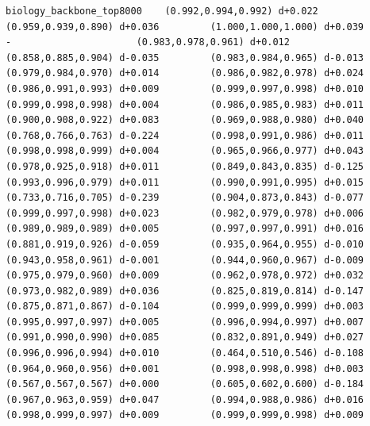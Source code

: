 \documentclass[11pt, letterpaper, openany]{book}
\begin{document}
\begin{empiricalbox}
\begin{lstlisting}[style=terminal]
biology_backbone_top8000    (0.992,0.994,0.992) d+0.022         (0.959,0.939,0.890) d+0.036         (1.000,1.000,1.000) d+0.039                      -                      (0.983,0.978,0.961) d+0.012         (0.858,0.885,0.904) d-0.035         (0.983,0.984,0.965) d-0.013         (0.979,0.984,0.970) d+0.014         (0.986,0.982,0.978) d+0.024         (0.986,0.991,0.993) d+0.009         (0.999,0.997,0.998) d+0.010         (0.999,0.998,0.998) d+0.004         (0.986,0.985,0.983) d+0.011         (0.900,0.908,0.922) d+0.083         (0.969,0.988,0.980) d+0.040         (0.768,0.766,0.763) d-0.224         (0.998,0.991,0.986) d+0.011         (0.998,0.998,0.999) d+0.004         (0.965,0.966,0.977) d+0.043         (0.978,0.925,0.918) d+0.011         (0.849,0.843,0.835) d-0.125         (0.993,0.996,0.979) d+0.011         (0.990,0.991,0.995) d+0.015         (0.733,0.716,0.705) d-0.239         (0.904,0.873,0.843) d-0.077         (0.999,0.997,0.998) d+0.023         (0.982,0.979,0.978) d+0.006         (0.989,0.989,0.989) d+0.005         (0.997,0.997,0.991) d+0.016         (0.881,0.919,0.926) d-0.059         (0.935,0.964,0.955) d-0.010         (0.943,0.958,0.961) d-0.001         (0.944,0.960,0.967) d-0.009         (0.975,0.979,0.960) d+0.009         (0.962,0.978,0.972) d+0.032         (0.973,0.982,0.989) d+0.036         (0.825,0.819,0.814) d-0.147         (0.875,0.871,0.867) d-0.104         (0.999,0.999,0.999) d+0.003         (0.995,0.997,0.997) d+0.005         (0.996,0.994,0.997) d+0.007         (0.991,0.990,0.990) d+0.085         (0.832,0.891,0.949) d+0.027         (0.996,0.996,0.994) d+0.010         (0.464,0.510,0.546) d-0.108         (0.964,0.960,0.956) d+0.001         (0.998,0.998,0.998) d+0.003         (0.567,0.567,0.567) d+0.000         (0.605,0.602,0.600) d-0.184         (0.967,0.963,0.959) d+0.047         (0.994,0.988,0.986) d+0.016         (0.998,0.999,0.997) d+0.009         (0.999,0.999,0.998) d+0.009     

\end{lstlisting}
\end{empiricalbox}
\end{document}
